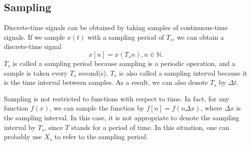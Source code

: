 \documentclass[journal,twoside]{IEEEtran}
\begin{document}
\subsection{Sampling}

Discrete-time signals can be obtained by taking samples of continuous-time signals. If we sample $x(t)$ with a sampling period of $T_s$, we can obtain a discrete-time signal
\begin{equation}
x[n] = x(T_s n), n\in\mathbb{N}.
\end{equation}
$T_s$ is called a sampling period because sampling is a periodic operation, and a sample is taken every $T_s$ second(s). $T_s$ is also called a sampling interval because it is the time interval between samples. As a result, we can also denote $T_s$ by $\Delta t$.

Sampling is not restricted to functions with respect to time. In fact, for any function $f(x)$, we can sample the function by $f[n] = f(n \Delta x)$, where $\Delta x$ is the sampling interval. In this case, it is not appropriate to denote the sampling interval by $T_s$, since $T$ stands for a period of time. In this situation, one can probably use $X_s$ to refer to the sampling period.
\end{document}
